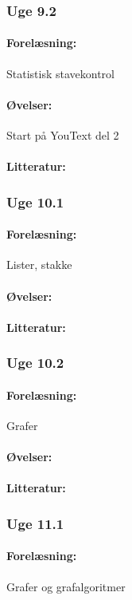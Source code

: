 \documentclass[12pt]{article}
\begin{document}
\subsubsection{Uge 9.2}
\paragraph{Forelæsning:} 
Statistisk stavekontrol
\paragraph{Øvelser:}
Start på YouText del 2
\paragraph{Litteratur:}

\subsubsection{Uge 10.1}
\paragraph{Forelæsning:} 
Lister, stakke
\paragraph{Øvelser:}
\paragraph{Litteratur:}

\subsubsection{Uge 10.2}
\paragraph{Forelæsning:} 
Grafer 
\paragraph{Øvelser:}
\paragraph{Litteratur:}

\subsubsection{Uge 11.1}
\paragraph{Forelæsning:} 
Grafer og grafalgoritmer
\end{document}

